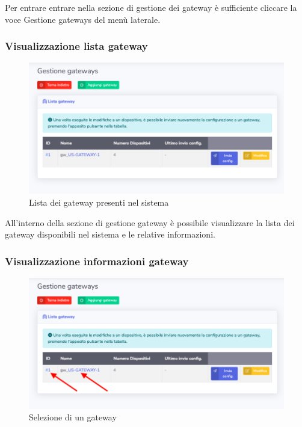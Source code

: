 		Per entrare entrare nella sezione di gestione dei gateway è sufficiente cliccare la voce Gestione gateways del menù laterale.

	\subsubsection{Visualizzazione lista gateway}

		\begin{figure}[H]
		\centering
		\includegraphics[scale=0.600]{res/images/admin/listaGateway.png}
		\caption{Lista dei gateway presenti nel sistema}
	\end{figure}

		All'interno della sezione di gestione gateway è possibile visualizzare la lista dei gateway disponibili nel sistema e le relative informazioni.

	\subsubsection{Visualizzazione informazioni gateway}

		\begin{figure}[H]
		\centering
		\includegraphics[scale=0.600]{res/images/admin/selDettGateway.png}
		\caption{Selezione di un gateway}
	\end{figure}


